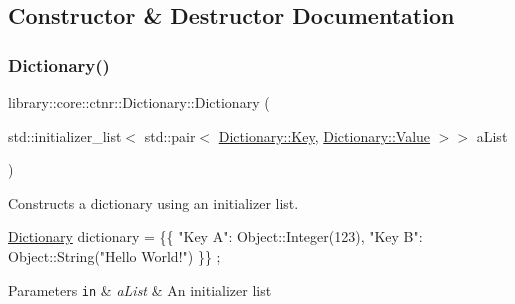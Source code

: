 \subsection{Constructor \& Destructor Documentation}
\mbox{\label{classlibrary_1_1core_1_1ctnr_1_1_dictionary_a823a08112d9ee271f9fa5833f030ea1a}} 
\subsubsection{\texorpdfstring{Dictionary()}{Dictionary()}\hspace{0.1cm}{\footnotesize\ttfamily [1/2]}}
{\footnotesize\ttfamily library\+::core\+::ctnr\+::\+Dictionary\+::\+Dictionary (\begin{DoxyParamCaption}\item[{std\+::initializer\+\_\+list$<$ std\+::pair$<$ \hyperlink{classlibrary_1_1core_1_1types_1_1_string}{Dictionary\+::\+Key}, \hyperlink{classlibrary_1_1core_1_1ctnr_1_1_object}{Dictionary\+::\+Value} $>$$>$}]{a\+List }\end{DoxyParamCaption})}



Constructs a dictionary using an initializer list. 


\begin{DoxyCode}
\hyperlink{classlibrary_1_1core_1_1ctnr_1_1_dictionary_a823a08112d9ee271f9fa5833f030ea1a}{Dictionary} dictionary = \{\{ \textcolor{stringliteral}{"Key A"}: Object::Integer(123), \textcolor{stringliteral}{"Key B"}: Object::String(\textcolor{stringliteral}{"Hello World!"})
       \}\} ;
\end{DoxyCode}



\begin{DoxyParams}[1]{Parameters}
\mbox{\tt in}  & {\em a\+List} & An initializer list \\
\hline
\end{DoxyParams}
\mbox{\label{classlibrary_1_1core_1_1ctnr_1_1_dictionary_a17e09d0a01799ed41cb6dfe9cf7dd52c}} 
